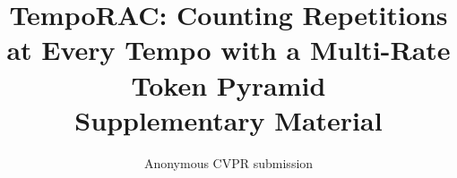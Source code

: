 \documentclass[10pt,twocolumn,letterpaper]{article}
\title{TempoRAC: Counting Repetitions at Every Tempo with a Multi-Rate Token Pyramid\\Supplementary Material}
\author{Anonymous CVPR submission}
\begin{document}
\maketitle

{\small


}
\end{document}
